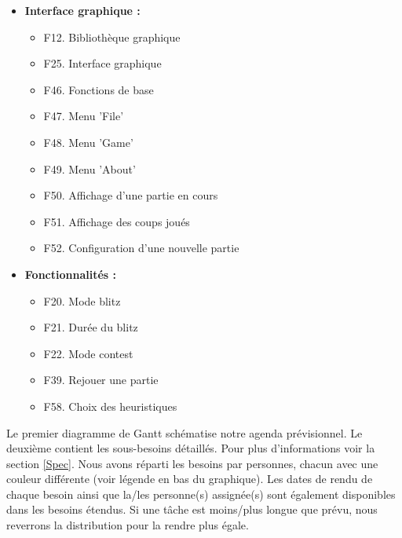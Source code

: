 \documentclass{article}
\begin{document}
\begin{itemize}
    \item \textbf{Interface graphique :}
    \begin{itemize}
        \item F12. Bibliothèque graphique
        \item F25. Interface graphique
        \item F46. Fonctions de base
        \item F47. Menu 'File'
        \item F48. Menu 'Game'
        \item F49. Menu 'About'
        \item F50. Affichage d'une partie en cours
        \item F51. Affichage des coups joués
        \item F52. Configuration d'une nouvelle partie
    \end{itemize}
    \item \textbf{Fonctionnalités :}
    \begin{itemize}
        \item F20. Mode blitz
        \item F21. Durée du blitz
        \item F22. Mode contest
        \item F39. Rejouer une partie
        \item F58. Choix des heuristiques
    \end{itemize}
\end{itemize}



Le premier diagramme de Gantt schématise notre agenda prévisionnel. Le deuxième contient les sous-besoins détaillés. 
Pour plus d'informations voir la section \ref{Spec}. Nous avons réparti les besoins par personnes,
chacun avec une couleur différente (voir légende en bas du graphique). Les dates de rendu de chaque besoin ainsi que 
la/les personne(s) assignée(s) sont également disponibles dans les besoins étendus. Si une tâche est moins/plus longue
que prévu, nous reverrons la distribution pour la rendre plus égale.
\end{document}
